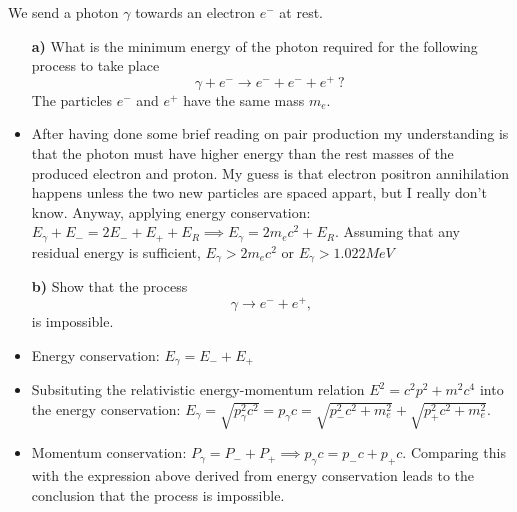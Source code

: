 \documentclass[11pt,a4paper]{report}
\newcounter{excount}[chapter]
\newenvironment{exercise}[1][]{\addtocounter{excount}{1} \noindent {\bf Problem
    \arabic{excount} \ \ #1}\hspace{2mm}}{\vspace{4mm}}
\begin{document}
\begin{exercise}
We send a photon $\gamma$ towards an electron $e^-$ at rest.
\begin{itemize}
\item[\bf a)] What is the minimum energy of the photon required for the following process to take place
\begin{equation}
\gamma + e^- \rightarrow e^- + e^- + e^+ \ \text{?   }
\end{equation}
The particles $e^-$ and $e^+$ have the same mass $m_e$.
\item After having done some brief reading on pair production my understanding is that the photon must have higher energy than the rest masses of the produced electron and proton. My guess is that electron positron annihilation happens unless the two new particles are spaced appart, but I really don't know. Anyway, applying energy conservation:
$E_{\gamma}+E_-=2E_-+E_+ +E_R \implies  E_{\gamma}=2m_ec^2 +E_R$. Assuming that any residual energy is sufficient, $E_{\gamma}>2m_ec^2$ or $E_{\gamma}> 1.022 MeV$
\item[\bf b)] Show that the process
\begin{equation}
\gamma \rightarrow e^- + e^+,
\end{equation}
is impossible.
\item Energy conservation: $E_{\gamma}=E_-+E_+$ 
\item Subsituting the relativistic energy-momentum relation $E^2=c^2p^2+m^2c^4$ into the energy conservation: 
$E_{\gamma}=\sqrt{p_{\gamma}^2c^2}=p_{\gamma}c=\sqrt{p_-^2c^2+m_e^2}+\sqrt{p_+^2c^2+m_e^2}$. 
\item Momentum conservation: $P_{\gamma}=P_                                                                                                                                                                                                                                                                                                                                                                     -+P_+ \implies p_{\gamma}c=p_-c+p_+c$. Comparing this with the expression above derived from energy conservation leads to the conclusion that the process is impossible.
\end{itemize}
\end{exercise}
\end{document}

